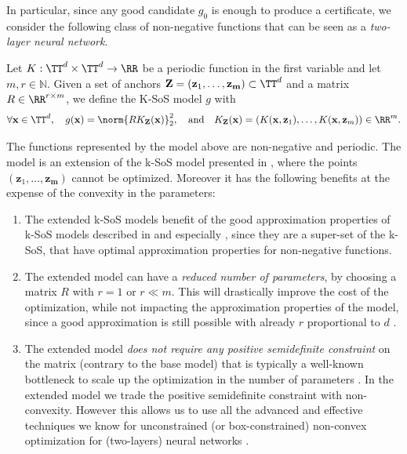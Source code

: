 \documentclass{article}
\begin{document}
In particular, since any good candidate $g_0$ is enough to produce a certificate, we consider the following class of non-negative functions that can be seen as a \emph{two-layer neural network}.

\begin{definition}\label{def:ksos-torus}
  Let $K: \TT^d \times \TT^d \to \RR$ be a periodic function in the first variable and let $m, r \in \mathbb{N}$. Given a set of anchors $\mathbf{Z} = (\mathbf{z}_1, \dots, \mathbf{z_m}) \subset \TT^d$ and a matrix $R \in \RR^{r \times m}$, we define the K-SoS model $g$ with
  \begin{equation}\label{eq:def-ksos-torus}
    \forall \mathbf{x} \in \TT^d, \quad g(\mathbf{x}) = \norm{R K_\mathbf{Z}(\mathbf{x})}_2^2, \quad \textrm{and} \quad K_\mathbf{Z}(\mathbf{x}) = (K(\mathbf{x},\mathbf{z}_1), \dots, K(\mathbf{x},\mathbf{z}_m)) \in \RR^m.
  \end{equation}
\end{definition}

The functions represented by the model above are non-negative and periodic.
The model is an extension of the k-SoS model presented in \cite{marteau-fereyNonparametricModelsNonnegative2020}, where the points $(\mathbf{z}_1, \dots, \mathbf{z_m})$ cannot be optimized. Moreover it has the following benefits at the expense of the convexity in the parameters:
\begin{enumerate}
  \item The extended k-SoS models benefit of the good approximation properties of k-SoS models described in \cite{marteau-fereyNonparametricModelsNonnegative2020} and especially \cite{rudiPSDRepresentationsEffective2021}, since they are a super-set of the k-SoS, that have optimal approximation properties for non-negative functions.
  \item The extended model can have a \emph{reduced number of parameters}, by choosing a matrix $R$ with $r = 1$ or $r \ll m$. This will drastically improve the cost of the optimization, while not impacting the approximation properties of the model, since a good approximation is still possible with already $r$ proportional to $d$ \cite[see Thm. 3]{rudiFindingGlobalMinima2020}.
  \item The extended model \emph{does not require any positive semidefinite constraint} on the matrix (contrary to the base model) that is typically a well-known bottleneck to scale up the optimization in the number of parameters \cite{marteau-fereyNonparametricModelsNonnegative2020}. In the extended model we trade the positive semidefinite constraint with non-convexity. However this allows us to use all the advanced and effective  techniques we know for unconstrained (or box-constrained) non-convex optimization for (two-layers) neural networks \cite{goodfellow2016deep}.
\end{enumerate}
\end{document}
